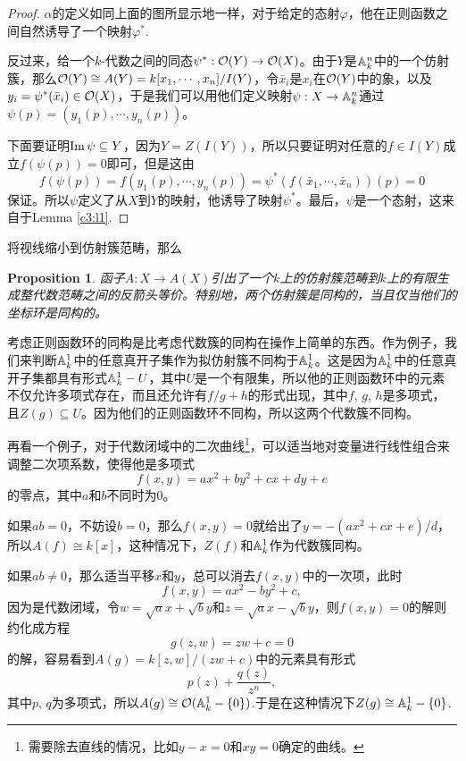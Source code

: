 \documentclass[9pt]{extbook}
\theoremstyle{plain}%
\newtheorem{pro}[defi]{Proposition}%
\begin{document}
\begin{proof}
	$\alpha$的定义如同上面的图所显示地一样，对于给定的态射$\varphi$，他在正则函数之间自然诱导了一个映射$\varphi^*$.

	反过来，给一个$k$-代数之间的同态$\psi^*:\mathcal{O}(Y)\to \mathcal{O}(X)$。由于$Y$是$\mathbb{A}^n_k$中的一个仿射簇，那么$\mathcal{O}(Y)\cong A(Y)=k[x_1,\cdots,x_n]/I(Y)$，令$\bar{x}_i$是$x_i$在$\mathcal{O}(Y)$中的象，以及$y_i=\psi^*(\bar{x}_i)\in \mathcal{O}(X)$，于是我们可以用他们定义映射$\psi:X\to \mathbb{A}^n_k$通过$\psi(p)=(y_1(p),\cdots,y_n(p))$。

	下面要证明$\operatorname{Im} \psi\subseteq Y$，因为$Y=Z(I(Y))$，所以只要证明对任意的$f\in I(Y)$成立$f(\psi(p))=0$即可，但是这由
	\[
		f(\psi(p))=f(y_1(p),\cdots,y_n(p))=\psi^*(f(\bar{x}_1,\cdots,\bar{x}_n))(p)=0
	\]
	保证。所以$\psi$定义了从$X$到$Y$的映射，他诱导了映射$\psi^*$。最后，$\psi$是一个态射，这来自于Lemma \ref{c3:l1}.
\end{proof}

将视线缩小到仿射簇范畴，那么
\begin{pro}
函子$A:X\to A(X)$引出了一个$k$上的仿射簇范畴到$k$上的有限生成整代数范畴之间的反箭头等价。特别地，两个仿射簇是同构的，当且仅当他们的坐标环是同构的。
\end{pro}

考虑正则函数环的同构是比考虑代数簇的同构在操作上简单的东西。作为例子，我们来判断$\mathbb{A}^1_k$中的任意真开子集作为拟仿射簇不同构于$\mathbb{A}^1_k$。这是因为$\mathbb{A}^1_k$中的任意真开子集都具有形式$\mathbb{A}^1_k-U$，其中$U$是一个有限集，所以他的正则函数环中的元素不仅允许多项式存在，而且还允许有$f/g+h$的形式出现，其中$f$, $g$, $h$是多项式，且$Z(g)\subseteq U$。因为他们的正则函数环不同构，所以这两个代数簇不同构。

再看一个例子，对于代数闭域中的二次曲线\footnote{需要除去直线的情况，比如$y-x=0$和$xy=0$确定的曲线。}，可以适当地对变量进行线性组合来调整二次项系数，使得他是多项式
\[
	f(x,y)=ax^2+by^2+cx+dy+e
\]
的零点，其中$a$和$b$不同时为$0$。

如果$ab=0$，不妨设$b=0$，那么$f(x,y)=0$就给出了$y=-(ax^2+cx+e)/d$，所以$A(f)\cong k[x]$，这种情况下，$Z(f)$和$\mathbb{A}^1_k$作为代数簇同构。

如果$ab\neq 0$，那么适当平移$x$和$y$，总可以消去$f(x,y)$中的一次项，此时
\[
	f(x,y)=ax^2-by^2+c,
\]
因为是代数闭域，令$w=\sqrt{a}x+\sqrt{b}y$和$z=\sqrt{a}x-\sqrt{b}y$，则$f(x,y)=0$的解则约化成方程
\[
	g(z,w)=zw+c=0
\]
的解，容易看到$A(g)=k[z,w]/(zw+c)$中的元素具有形式
\[
	p(z)+\frac{q(z)}{z^n},
\]
其中$p$, $q$为多项式，所以$A(g)\cong \mathcal{O}(\mathbb{A}^1_k-\{0\})$.于是在这种情况下$Z(g)\cong \mathbb{A}^1_k-\{0\}$.
\end{document}
